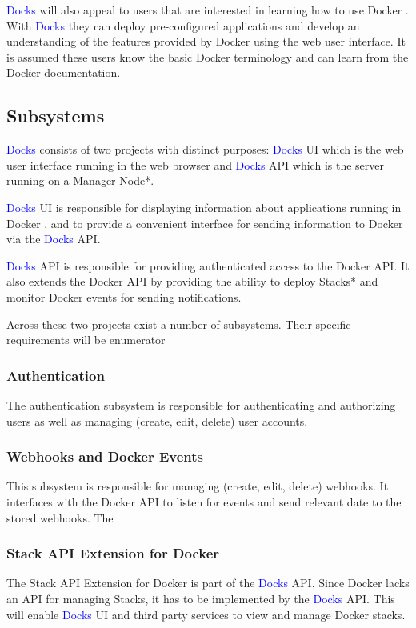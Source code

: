 \documentclass[]{article}
\newcommand{\docks}{\textcolor{Blue}{Docks} }
\newcommand{\docker}{Docker }
\begin{document}
\docks will also appeal to users that are interested in learning how
to use \docker. With \docks they can deploy pre-configured applications and
develop an understanding of the features provided by \docker using the 
web user interface. It is assumed these users know the basic \docker
terminology and can learn from the \docker documentation.

\subsection{Subsystems}

\docks consists of two projects with distinct purposes:
\docks UI which is the web user interface running in the web browser
and \docks API which is the server running on a Manager Node*.

\docks UI is responsible for displaying information about applications running
in \docker, and to provide a convenient interface for sending information
to \docker via the \docks API.

\docks API is responsible for providing authenticated access to the \docker API.
It also extends the \docker API by providing the ability to deploy Stacks*
and monitor \docker events for sending notifications.

Across these two projects exist a number of subsystems.
Their specific requirements will be enumerator

\subsubsection{Authentication}
The authentication subsystem is responsible for authenticating
and authorizing users as well as managing (create, edit, delete) user accounts.

\subsubsection{Webhooks and Docker Events}
This subsystem is responsible for managing (create, edit, delete) webhooks.
It interfaces with the Docker API to listen for events and send relevant
date to the stored webhooks. The

\subsubsection{Stack API Extension for Docker}
The Stack API Extension for \docker is part of the \docks API.
Since \docker lacks an API for managing Stacks, it has to be implemented
by the \docks API. This will enable \docks UI and third party services
to view and manage \docker stacks.
\end{document}
